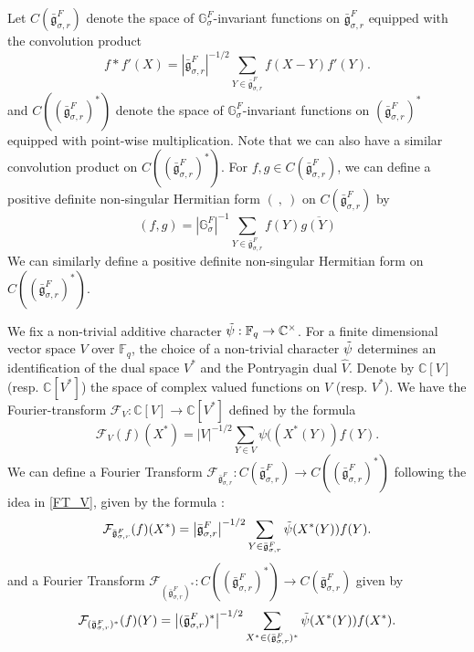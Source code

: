 \documentclass[11 pt]{article}
\numberwithin{equation}{subsection}
\theoremstyle{definition}
\theoremstyle{remark}
\theoremstyle{conjecture}
\newcommand{\bg}{\bar{\mathfrak g}}
\newcommand{\F}{\mathbb F}
\newcommand{\mcF}{\mathcal F}
\newcommand{\G}{\mathbb G}
\begin{document}
Let $C(\bg_{\sigma,r}^F)$ denote the space of $\G_\sigma^F$-invariant functions on $\bg_{\sigma,r}^F$ equipped with the convolution product
\begin{equation}
    f*f'(X)=\left|\bg_{\sigma,r}^F\right|^{-1/2}\sum_{Y\in \bg_{\sigma,r}^F}f(X-Y)f'(Y).
\end{equation}
and $C\left((\bg_{\sigma,r}^F)^*\right)$ denote the space of  $\G_\sigma^F$-invariant functions on $(\bg_{\sigma,r}^F)^*$ equipped with point-wise multiplication. Note that we can also have a similar convolution product on  $C\left((\bg_{\sigma,r}^F)^*\right)$. For $f,g \in C(\bg_{\sigma,r}^F)$, we can define a positive definite non-singular Hermitian form $(\:,\:)$ on $C(\bg_{\sigma,r}^F)$ by 
\begin{equation*}
    (f,g)= \left|\G_{\sigma}^F\right|^{-1}\sum_{Y\in \bg_{\sigma,r}^F}f(Y)\overline{g(Y)}
\end{equation*}
    We can similarly define a positive definite non-singular Hermitian form on $C\left((\bg_{\sigma,r}^F)^*\right)$. \par
We fix a non-trivial additive character $\Tilde{\psi}:\mathbb {F}_q\to\mathbb C^\times$. For a finite dimensional vector space $V$ over $\F_q$, the choice of a non-trivial character $\Tilde{\psi}$ determines an identification  of the dual space $V^*$ and the Pontryagin dual $\widehat{V}$. 
Denote by $\mathbb C[V]$ (resp. $\mathbb C[V^*]$) the space of complex valued functions on $V$ (resp. $V^*$). We have the Fourier-transform
$\mcF_V:\mathbb C[V]\to \mathbb C[V^*]$
defined by the formula
\begin{equation}\label{FT_V}
\mcF_V(f)(X^*)=|V|^{-1/2}\sum_{Y\in V}\psi(( X^*(Y))f(Y).
\end{equation}
We can define a Fourier Transform $\mcF_{\bg_{\sigma,r}^F}:C(\bg_{\sigma,r}^F) \longrightarrow C\left((\bg_{\sigma,r}^F)^*\right)$ following the idea in \eqref{FT_V}, given by the formula :
\begin{equation}\label{fourierdefnlie}
    \mcF_{\bg_{\sigma,r}^F}(f)(X^*)=\left|\bg_{\sigma,r}^F\right|^{-1/2}\sum_{Y\in \bg_{\sigma,r}^F}\Tilde\psi( X^*(Y))f(Y).
\end{equation}
and a Fourier Transform $ \mcF_{(\bg_{\sigma,r}^F)^*}:C\left((\bg_{\sigma,r}^F)^*\right) \longrightarrow C(\bg_{\sigma,r}^F) $ given by 
\begin{equation}\label{fourierdefndual}
  \mcF_{(\bg_{\sigma,r}^F)^*}(f)(Y)=\left|(\bg_{\sigma,r}^F)^*\right|^{-1/2}\sum_{X^*\in (\bg_{\sigma,r}^F)^*}\Tilde\psi( X^*(Y))f(X^*).
\end{equation}
\end{document}
